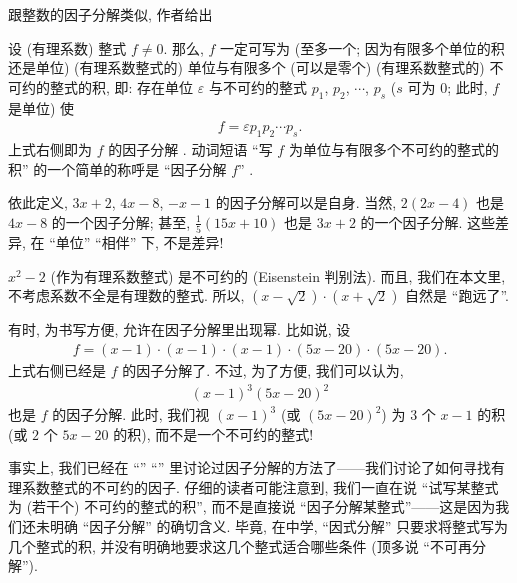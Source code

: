 跟整数的因子分解类似, 作者给出
\begin{definition}
    设 (有理系数) 整式 $f \neq 0$. 那么, $f$ 一定可写为 (至多一个; 因为有限多个单位的积还是单位) (有理系数整式的) 单位与有限多个 (可以是零个) (有理系数整式的) 不可约的整式的积, 即: 存在单位 $\varepsilon$ 与不可约的整式 $p_1$, $p_2$, $\cdots$, $p_s$ ($s$ 可为 $0$; 此时, $f$ 是单位) 使
    \begin{align*}
        f = \varepsilon p_1 p_2 \cdots p_s.
    \end{align*}
    上式右侧即为 $f$ 的因子分解 . 动词短语 ``写 $f$ 为单位与有限多个不可约的整式的积'' 的一个简单的称呼是 ``因子分解 $f$'' .
\end{definition}

\begin{remark}
    依此定义, $3x + 2$, $4x - 8$, $-x - 1$ 的因子分解可以是自身. 当然, $2(2x - 4)$ 也是 $4x - 8$ 的一个因子分解; 甚至, $\frac{1}{5} (15x + 10)$ 也是 $3x + 2$ 的一个因子分解. 这些差异, 在 ``单位'' ``相伴'' 下, 不是差异!

    $x^2 - 2$ (作为有理系数整式) 是不可约的 (Eisenstein 判别法). 而且, 我们在本文里, 不考虑系数不全是有理数的整式. 所以, $(x - \sqrt{2}) \cdot (x + \sqrt{2})$ 自然是 ``跑远了''.
\end{remark}

\begin{remark}
    有时, 为书写方便, 允许在因子分解里出现幂. 比如说, 设
    \begin{align*}
        f = (x-1) \cdot (x-1) \cdot (x-1) \cdot (5x-20) \cdot (5x-20).
    \end{align*}
    上式右侧已经是 $f$ 的因子分解了. 不过, 为了方便, 我们可以认为,
    \begin{align*}
        (x-1)^3 (5x-20)^2
    \end{align*}
    也是 $f$ 的因子分解. 此时, 我们视 $(x-1)^3$ (或 $(5x-20)^2$) 为 $3$ 个 $x-1$ 的积 (或 $2$ 个 $5x-20$ 的积), 而不是一个不可约的整式!
\end{remark}

事实上, 我们已经在 ``\RationalRootsOfPolynomialsOverQ'' ``\FactorsOfHigherDegreeOfPolynomialsOverQ'' 里讨论过因子分解的方法了——我们讨论了如何寻找有理系数整式的不可约的因子. 仔细的读者可能注意到, 我们一直在说 ``试写某整式为 (若干个) 不可约的整式的积'', 而不是直接说 ``因子分解某整式''——这是因为我们还未明确 ``因子分解'' 的确切含义. 毕竟, 在中学, ``因式分解'' 只要求将整式写为几个整式的积, 并没有明确地要求这几个整式适合哪些条件 (顶多说 ``不可再分解'').

